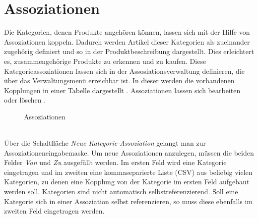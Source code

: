 \clearpage


\section{Assoziationen}
\label{chp:Assoziationen}
Die Kategorien, denen Produkte angehören können, lassen sich mit der Hilfe von Assoziationen koppeln. Dadurch werden Artikel dieser Kategorien als zueinander zu\-ge\-hö\-rig definiert und so in der Produktbeschreibung  dargestellt. Dies erleichtert es, zusammengehörige Produkte zu erkennen und zu kaufen. Diese Kategorieassoziationen lassen sich in der Assosiationsverwaltung definieren, die über das Verwaltungsmenü erreichbar ist. In dieser werden die vorhandenen Kopplungen in einer Tabelle dargestellt . Assoziationen lassen sich bearbeiten  oder löschen . \\

\begin{figure}[h!]
  \centering
  \caption{Assoziationen}
  \label{fig:Assoziationen}
\end{figure}
\text{}\vspace*{-1em}\\
Über die Schaltfläche \textit{Neue Kategorie-Assoziation}  gelangt man zur Asso\-zia\-tionen\-ein\-ga\-be\-mas\-ke. Um neue Assoziationen anzulegen, müssen die beiden Felder \textit{Von} und \textit{Zu} ausgefüllt werden. Im ersten Feld wird eine Kategorie eingetragen und im zweiten eine kommaseparierte Liste (CSV) aus beliebig vielen Kategorien, zu denen eine Kopplung von der Kategorie im ersten Feld aufgebaut werden soll. Kategorien sind nicht automatisch selbstreferenzierend. Soll eine Kategorie sich in einer Assoziation selbst referenzieren, so muss diese ebenfalls im zweiten Feld eingetragen werden.

